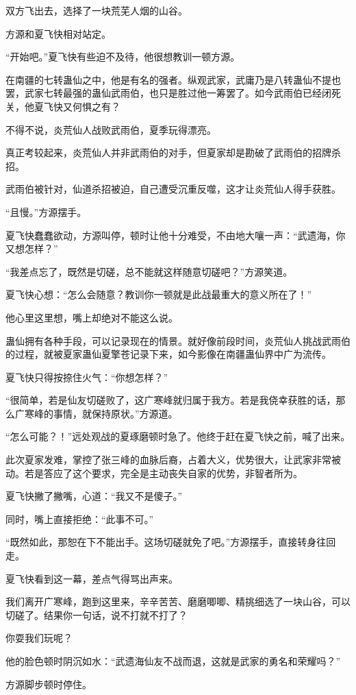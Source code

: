 \begin{this_body}
双方飞出去，选择了一块荒芜人烟的山谷。

方源和夏飞快相对站定。

“开始吧。”夏飞快有些迫不及待，他很想教训一顿方源。

在南疆的七转蛊仙之中，他是有名的强者。纵观武家，武庸乃是八转蛊仙不提也罢，武家七转最强的蛊仙武雨伯，也只是胜过他一筹罢了。如今武雨伯已经闭死关，他夏飞快又何惧之有？

不得不说，炎荒仙人战败武雨伯，夏季玩得漂亮。

真正考较起来，炎荒仙人并非武雨伯的对手，但夏家却是勘破了武雨伯的招牌杀招。

武雨伯被针对，仙道杀招被迫，自己遭受沉重反噬，这才让炎荒仙人得手获胜。

“且慢。”方源摆手。

夏飞快蠢蠢欲动，方源叫停，顿时让他十分难受，不由地大嚷一声：“武遗海，你又想怎样？”

“我差点忘了，既然是切磋，总不能就这样随意切磋吧？”方源笑道。

夏飞快心想：“怎么会随意？教训你一顿就是此战最重大的意义所在了！”

他心里这里想，嘴上却绝对不能这么说。

蛊仙拥有各种手段，可以记录现在的情景。就好像前段时间，炎荒仙人挑战武雨伯的过程，就被夏家蛊仙夏擎苍记录下来，如今影像在南疆蛊仙界中广为流传。

夏飞快只得按捺住火气：“你想怎样？”

“很简单，若是仙友切磋败了，这广寒峰就归属于我方。若是我侥幸获胜的话，那么广寒峰的事情，就保持原状。”方源道。

“怎么可能？！”远处观战的夏琢磨顿时急了。他终于赶在夏飞快之前，喊了出来。

此次夏家发难，掌控了张三峰的血脉后裔，占着大义，优势很大，让武家非常被动。若是答应了这个要求，完全是主动丧失自家的优势，非智者所为。

夏飞快撇了撇嘴，心道：“我又不是傻子。”

同时，嘴上直接拒绝：“此事不可。”

“既然如此，那恕在下不能出手。这场切磋就免了吧。”方源摆手，直接转身往回走。

夏飞快看到这一幕，差点气得骂出声来。

我们离开广寒峰，跑到这里来，辛辛苦苦、磨磨唧唧、精挑细选了一块山谷，可以切磋了。结果你一句话，说不打就不打了？

你耍我们玩呢？

他的脸色顿时阴沉如水：“武遗海仙友不战而退，这就是武家的勇名和荣耀吗？”

方源脚步顿时停住。


\end{this_body}
